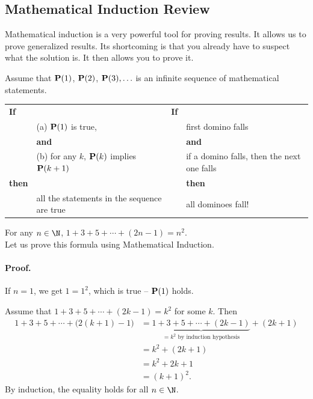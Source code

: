 \subsection{Mathematical Induction Review}
\label{app:induction}






Mathematical induction is a very powerful tool for proving results. It allows us to prove generalized results. 
Its shortcoming is that you already have to suspect what the solution is. It then allows you to prove it.


\begin{definition}
	
Assume that ${\bf P}(1)$, ${\bf P}(2)$, ${\bf P}(3), \ldots$ is an infinite sequence of mathematical statements. \\

\begin{tabular}{ll|ll}
{\bf If}  & & {\bf If} \\
	& (a) \quad ${\bf P}(1)$ is true, 		& & first domino falls \\
	& 	{\bf and} & & {\bf and} \\
	& (b) \quad  for any $k$, ${\bf P}(k)$ implies ${\bf P}(k+1)$ 	
		& & if a domino falls, then the next one falls \\
{\bf then} & & & {\bf then} \\
	& all the statements in the sequence are true	& & all dominoes fall!
\end{tabular}

\end{definition}


\begin{example}
For any $n\in \N$, $1+3+5+\cdots+(2n-1) = n^2$. \\

Let us prove this formula using Mathematical Induction.

\paragraph{Proof.}
If $n=1$, we get $1=1^2$, which is true -- ${\bf P}(1)$ holds.

Assume that $1+3+5+\cdots+(2k-1) = k^2$ for some $k$.
Then
\begin{align*}
1+3+5+\cdots+\big(2(k+1)-1\big) 
	& = \underbrace{1+3+5+\cdots+(2k-1)}_{= k^2 \text{ by induction hypothesis}} + (2k+1) \\
	& = k^2+(2k+1)\\
	& = k^2 + 2k + 1\\
	& = (k+1)^2.
\end{align*}
By induction, the equality holds for all $n\in \N$.

\end{example}


